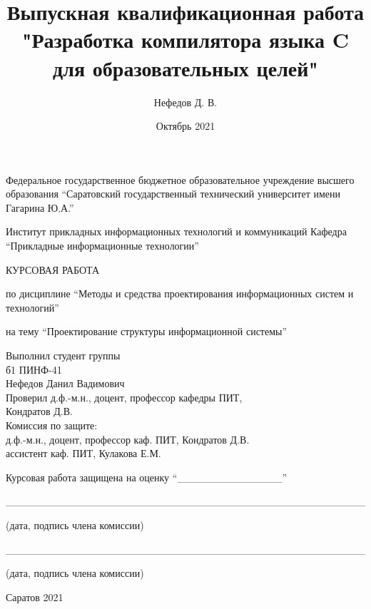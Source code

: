 \documentclass[14pt,russian]{extarticle}
\title{Выпускная квалификационная работа "Разработка компилятора языка C для
образовательных целей"}
\author{Нефедов Д. В.}
\date{Октябрь 2021}
\begin{document}
\begin{titlepage}
	\begin{center}
		\singlespacing

		Федеральное государственное бюджетное образовательное учреждение высшего
		образования \enquote{Саратовский государственный технический университет имени
		Гагарина Ю.А.}

		\bigskip
		\bigskip

		Институт прикладных информационных технологий и коммуникаций
		Кафедра \enquote{Прикладные информационные технологии}

		\bigskip
		\bigskip
		\bigskip
		\bigskip

		\singlespacing

		КУРСОВАЯ РАБОТА

		по дисциплине \enquote{Методы и средства проектирования информационных систем и
		технологий}

		на тему \enquote{Проектирование структуры информационной системы}
	\end{center}

	\bigskip

	\begin{flushright}

		Выполнил студент группы \\
		б1 ПИНФ-41 \\
		Нефедов Данил Вадимович \\
		Проверил д.ф.-м.н., доцент, профессор кафедры ПИТ, \\
		Кондратов Д.В. \\
		Комиссия по защите: \\
		д.ф.-м.н., доцент, профессор каф. ПИТ, Кондратов Д.В. \\
		ассистент каф. ПИТ, Кулакова Е.М.
	\end{flushright}

	\bigskip

	\begin{flushleft}
		\singlespacing

		Курсовая работа защищена на оценку \enquote{\_\_\_\_\_\_\_\_\_\_\_\_\_\_}

		\bigskip
		\bigskip

		\_\_\_\_\_\_\_\_\_\_\_\_\_\_\_\_\_\_\_\_\_\_\_\_\_\_\_\_\_\_\_\_\_\_\_\_\_\_\_\_\_\_\_\_\_\_\_\_

		(дата, подпись члена комиссии)

		\_\_\_\_\_\_\_\_\_\_\_\_\_\_\_\_\_\_\_\_\_\_\_\_\_\_\_\_\_\_\_\_\_\_\_\_\_\_\_\_\_\_\_\_\_\_\_\_

		(дата, подпись члена комиссии)
	\end{flushleft}

	\vfill
	\centerline{Саратов 2021}
\end{titlepage}
\clearpage
\end{document}
